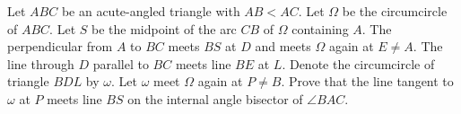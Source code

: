Let $ABC$ be an acute-angled triangle with $AB < AC$. Let $\Omega$ be the circumcircle of $ABC$. Let $S$ be the midpoint of the arc $CB$ of $\Omega$ containing $A$. The perpendicular from $A$ to $BC$ meets $BS$ at $D$ and meets $\Omega$ again at $E \neq A$. The line through $D$ parallel to $BC$ meets line $BE$ at $L$. Denote the circumcircle of triangle $BDL$ by $\omega$. Let $\omega$ meet $\Omega$ again at $P \neq B$. Prove that the line tangent to $\omega$ at $P$ meets line $BS$ on the internal angle bisector of $\angle BAC$.